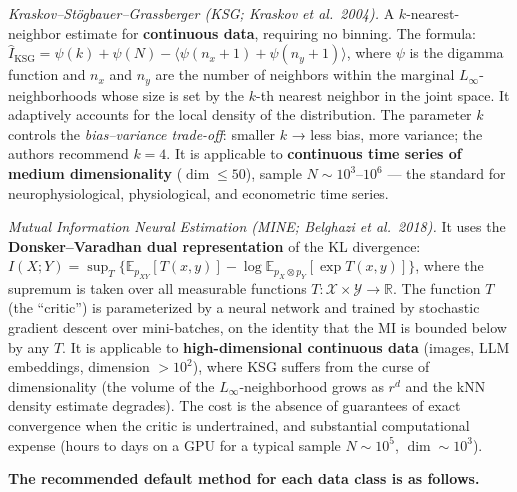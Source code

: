 \documentclass[pdflatex,sn-mathphys-ay]{sn-jnl}
\begin{document}
\emph{Kraskov--Stögbauer--Grassberger (KSG; Kraskov et al.~2004).} A \(k\)-nearest-neighbor estimate for \textbf{continuous data}, requiring no binning. The formula: \(\hat I_{\text{KSG}} = \psi(k) + \psi(N) - \langle \psi(n_x + 1) + \psi(n_y + 1) \rangle\), where \(\psi\) is the digamma function and \(n_x\) and \(n_y\) are the number of neighbors within the marginal \(L_\infty\)-neighborhoods whose size is set by the \(k\)-th nearest neighbor in the joint space. It adaptively accounts for the local density of the distribution. The parameter \(k\) controls the \emph{bias--variance trade-off}: smaller \(k\) → less bias, more variance; the authors recommend \(k = 4\). It is applicable to \textbf{continuous time series of medium dimensionality} (\(\dim \le 50\)), sample \(N \sim 10^3\)--\(10^6\) --- the standard for neurophysiological, physiological, and econometric time series.

\emph{Mutual Information Neural Estimation (MINE; Belghazi et al.~2018).} It uses the \textbf{Donsker--Varadhan dual representation} of the KL divergence: \(I(X; Y) = \sup_T \{\mathbb{E}_{p_{XY}}[T(x, y)] - \log \mathbb{E}_{p_X \otimes p_Y}[\exp T(x, y)]\}\), where the supremum is taken over all measurable functions \(T: \mathcal{X} \times \mathcal{Y} \to \mathbb{R}\). The function \(T\) (the ``critic'') is parameterized by a neural network and trained by stochastic gradient descent over mini-batches, on the identity that the MI is bounded below by any \(T\). It is applicable to \textbf{high-dimensional continuous data} (images, LLM embeddings, dimension \(> 10^2\)), where KSG suffers from the curse of dimensionality (the volume of the \(L_\infty\)-neighborhood grows as \(r^d\) and the kNN density estimate degrades). The cost is the absence of guarantees of exact convergence when the critic is undertrained, and substantial computational expense (hours to days on a GPU for a typical sample \(N \sim 10^5\), \(\dim \sim 10^3\)).

\textbf{The recommended default method for each data class is as follows.}
\end{document}

